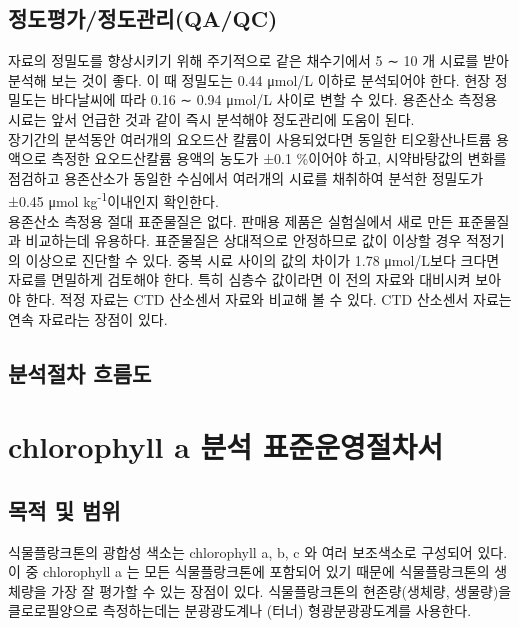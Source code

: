 \documentclass[
]{book}
\begin{document}
\hypertarget{uxc815uxb3c4uxd3c9uxac00uxc815uxb3c4uxad00uxb9acqaqc-1}{%
\section{정도평가/정도관리(QA/QC)}\label{uxc815uxb3c4uxd3c9uxac00uxc815uxb3c4uxad00uxb9acqaqc-1}}

자료의 정밀도를 향상시키기 위해 주기적으로 같은 채수기에서 5 ∼ 10 개 시료를 받아 분석해 보는 것이 좋다. 이 때 정밀도는 0.44 μmol/L 이하로 분석되어야 한다. 현장 정밀도는 바다날씨에 따라 0.16 ∼ 0.94 μmol/L 사이로 변할 수 있다. 용존산소 측정용 시료는 앞서 언급한 것과 같이 즉시 분석해야 정도관리에 도움이 된다.\\
장기간의 분석동안 여러개의 요오드산 칼륨이 사용되었다면 동일한 티오황산나트륨 용액으로 측정한 요오드산칼륨 용액의 농도가 ±0.1 \%이어야 하고, 시약바탕값의 변화를 점검하고 용존산소가 동일한 수심에서 여러개의 시료를 채취하여 분석한 정밀도가 ±0.45 μmol kg\textsuperscript{-1}이내인지 확인한다.\\
용존산소 측정용 절대 표준물질은 없다. 판매용 제품은 실험실에서 새로 만든 표준물질과 비교하는데 유용하다. 표준물질은 상대적으로 안정하므로 값이 이상할 경우 적정기의 이상으로 진단할 수 있다. 중복 시료 사이의 값의 차이가 1.78 μmol/L보다 크다면 자료를 면밀하게 검토해야 한다. 특히 심층수 값이라면 이 전의 자료와 대비시켜 보아야 한다. 적정 자료는 CTD 산소센서 자료와 비교해 볼 수 있다. CTD 산소센서 자료는 연속 자료라는 장점이 있다.

\hypertarget{uxbd84uxc11duxc808uxcc28-uxd750uxb984uxb3c4-1}{%
\section{분석절차 흐름도}\label{uxbd84uxc11duxc808uxcc28-uxd750uxb984uxb3c4-1}}

\hypertarget{chlorophyll-a-uxbd84uxc11d-uxd45cuxc900uxc6b4uxc601uxc808uxcc28uxc11c}{%
\chapter{chlorophyll a 분석 표준운영절차서}\label{chlorophyll-a-uxbd84uxc11d-uxd45cuxc900uxc6b4uxc601uxc808uxcc28uxc11c}}

\hypertarget{uxbaa9uxc801-uxbc0f-uxbc94uxc704-6}{%
\section{목적 및 범위}\label{uxbaa9uxc801-uxbc0f-uxbc94uxc704-6}}

식물플랑크톤의 광합성 색소는 chlorophyll a, b, c 와 여러 보조색소로 구성되어 있다. 이 중 chlorophyll a 는 모든 식물플랑크톤에 포함되어 있기 때문에 식물플랑크톤의 생체량을 가장 잘 평가할 수 있는 장점이 있다. 식물플랑크톤의 현존량(생체량, 생물량)을 클로로필양으로 측정하는데는 분광광도계나 (터너) 형광분광광도계를 사용한다.
\end{document}
